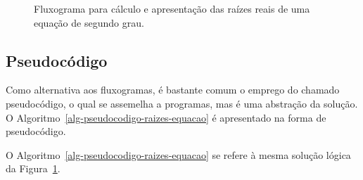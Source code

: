\documentclass[
  11pt,
  a4paper,
]{scrbook}
\begin{document}
\begin{figure}[tb]

\caption{\label{fig-fluxograma-raizes-equacao}Fluxograma para cálculo e
apresentação das raízes reais de uma equação de segundo grau.}


\end{figure}%

\subsection{Pseudocódigo}\label{pseudocuxf3digo}

Como alternativa aos fluxogramas, é bastante comum o emprego do chamado
pseudocódigo, o qual se assemelha a programas, mas é uma abstração da
solução. O Algoritmo~\ref{alg-pseudocodigo-raizes-equacao} é apresentado
na forma de pseudocódigo.

O Algoritmo~\ref{alg-pseudocodigo-raizes-equacao} se refere à mesma
solução lógica da Figura~\ref{fig-fluxograma-raizes-equacao}.
\end{document}
